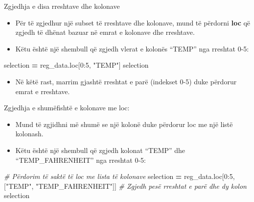 \documentclass[
  ignorenonframetext,
]{beamer}
\newenvironment{Shaded}{\begin{snugshade}}{\end{snugshade}}
\newcommand{\CommentTok}[1]{\textcolor[rgb]{0.56,0.35,0.01}{\textit{#1}}}
\newcommand{\DecValTok}[1]{\textcolor[rgb]{0.00,0.00,0.81}{#1}}
\newcommand{\NormalTok}[1]{#1}
\newcommand{\OperatorTok}[1]{\textcolor[rgb]{0.81,0.36,0.00}{\textbf{#1}}}
\newcommand{\StringTok}[1]{\textcolor[rgb]{0.31,0.60,0.02}{#1}}
\providecommand{\tightlist}{%
  \setlength{\itemsep}{0pt}\setlength{\parskip}{0pt}}
\begin{document}
\begin{frame}[fragile]{Zgjedhja e disa rreshtave dhe kolonave}
\protect\hypertarget{zgjedhja-e-disa-rreshtave-dhe-kolonave}{}
\begin{itemize}
\item
  Për të zgjedhur një subset të rreshtave dhe kolonave, mund të përdorni
  \textbf{loc} që zgjedh të dhënat bazuar në emrat e kolonave dhe
  rreshtave.
\item
  Këtu është një shembull që zgjedh vlerat e kolonës ``TEMP'' nga
  rreshtat 0-5:
\end{itemize}

\begin{Shaded}
\begin{Highlighting}[]
\NormalTok{selection }\OperatorTok{=}\NormalTok{ reg\_data.loc[}\DecValTok{0}\NormalTok{:}\DecValTok{5}\NormalTok{, }\StringTok{"TEMP"}\NormalTok{]}
\NormalTok{selection}
\end{Highlighting}
\end{Shaded}

\begin{itemize}
\tightlist
\item
  Në këtë rast, marrim gjashtë rreshtat e parë (indekset 0-5) duke
  përdorur emrat e rreshtave.
\end{itemize}
\end{frame}

\begin{frame}[fragile]{Zgjedhja e shumëfishtë e kolonave me loc:}
\protect\hypertarget{zgjedhja-e-shumuxebfishtuxeb-e-kolonave-me-loc}{}
\begin{itemize}
\item
  Mund të zgjidhni më shumë se një kolonë duke përdorur loc me një listë
  kolonash.
\item
  Këtu është një shembull që zgjedh kolonat ``TEMP'' dhe
  ``TEMP\_FAHRENHEIT'' nga rreshtat 0-5:
\end{itemize}

\begin{Shaded}
\begin{Highlighting}[]
\CommentTok{\# Përdorim të saktë të loc me lista të kolonave}
\NormalTok{selection }\OperatorTok{=}\NormalTok{ reg\_data.loc[}\DecValTok{0}\NormalTok{:}\DecValTok{5}\NormalTok{, [}\StringTok{"TEMP"}\NormalTok{, }\StringTok{"TEMP\_FAHRENHEIT"}\NormalTok{]]  }\CommentTok{\# Zgjedh pesë rreshtat e parë dhe dy kolon}
\NormalTok{selection}
\end{Highlighting}
\end{Shaded}
\end{frame}
\end{document}
